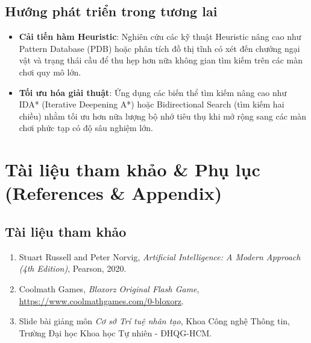 \documentclass[12pt,a4paper]{article}
\begin{document}
\subsection{Hướng phát triển trong tương lai}
\begin{itemize}
    \item \textbf{Cải tiến hàm Heuristic}: Nghiên cứu các kỹ thuật Heuristic nâng cao như Pattern Database (PDB) hoặc phân tích đồ thị tĩnh có xét đến chướng ngại vật và trạng thái cầu để thu hẹp hơn nữa không gian tìm kiếm trên các màn chơi quy mô lớn.
    \item \textbf{Tối ưu hóa giải thuật}: Ứng dụng các biến thể tìm kiếm nâng cao như IDA* (Iterative Deepening A*) hoặc Bidirectional Search (tìm kiếm hai chiều) nhằm tối ưu hơn nữa lượng bộ nhớ tiêu thụ khi mở rộng sang các màn chơi phức tạp có độ sâu nghiệm lớn.
\end{itemize}

\newpage

\section{Tài liệu tham khảo \& Phụ lục (References \& Appendix)}

\subsection{Tài liệu tham khảo}
\begin{enumerate}
    \item Stuart Russell and Peter Norvig, \textit{Artificial Intelligence: A Modern Approach (4th Edition)}, Pearson, 2020.
    \item Coolmath Games, \textit{Bloxorz Original Flash Game}, \url{https://www.coolmathgames.com/0-bloxorz}.
    \item Slide bài giảng môn \textit{Cơ sở Trí tuệ nhân tạo}, Khoa Công nghệ Thông tin, Trường Đại học Khoa học Tự nhiên - ĐHQG-HCM.
\end{enumerate}
\end{document}
